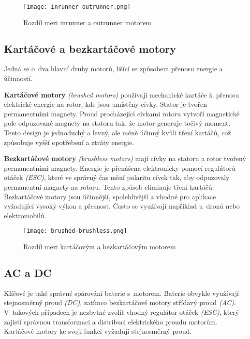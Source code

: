 \documentclass[12pt]{report}
\begin{document}
\begin{figure}[H]
	\centering
	\texttt{[image: inrunner-outrunner.png]}
	\caption{Rozdíl mezi inrunner a outrunner motorem \cite{rozum}}
	\label{fig:inrunner-outrunner.png}
  \end{figure}

\subsection[Kartáčové a bezkartáčové motory]{Kartáčové a bezkartáčové motory}
Jedná se o~dva hlavní druhy motorů, lišící se způsobem přenosu energie a účinností.

\textbf{Kartáčové motory} \textit{(brushed motors)} používají mechanické kartáče k~přenosu elektrické energie na rotor, kde jsou umístěny cívky. Stator je tvořen permanentními magnety. Proud procházející cívkami rotoru vytvoří magnetické pole odpuzované magnety na statoru tak, že motor generuje točivý moment. Tento design je jednoduchý a levný, ale méně účinný kvůli tření kartáčů, což způsobuje vyšší opotřebení a ztráty energie.

\textbf{Bezkartáčové motory} \textit{(brushless motors)} mají cívky na statoru a rotor tvořený permanentními magnety. Energie je přenášena elektronicky pomocí regulátorů otáček \textit{(ESC)}, které ve správný čas mění polaritu cívek tak, aby odpuzovaly permanentní magnety na rotoru. Tento způsob eliminuje tření kartáčů. Bezkartáčové motory jsou účinnější, spolehlivější a vhodné pro aplikace vyžadující vysoký výkon a přesnost. Často se využívají například u~dronů nebo elektromobilů.

\begin{figure}[H]
	\centering
	\texttt{[image: brushed-brushless.png]}
	\caption{Rozdíl mezi kartáčovým a bezkartáčovým motorem \cite{rozum}}
	\label{fig:brushed-brushless.png}
  \end{figure}

\subsection[AC a DC]{AC a DC}
Klíčové je také správné spárování baterie s~motorem. Baterie obvykle využívají stejnosměrný proud \textit{(DC)}, zatímco bezkartáčové motory střídavý proud \textit{(AC)}. V~takových případech je nezbytné zvolit vhodný regulátor otáček \textit{(ESC)}, který zajistí správnou transformaci a distribuci elektrického proudu motorům. Kartáčové motory ke svojí funkci vyžadují stejnosměrný proud. \cite{mainbook} \cite{dojo} \cite{ultimateguide} \cite{motors}
\end{document}
